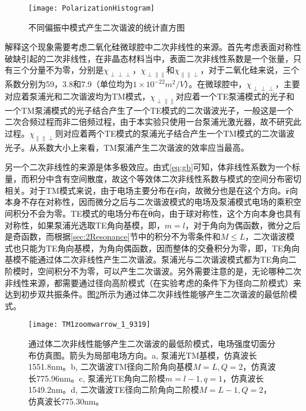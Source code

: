 \begin{figure}
\centering
\texttt{[image: PolarizationHistogram]}
\caption{不同偏振中模式产生二次谐波的统计直方图}
\label{pic:PolarizationHistogram}
\end{figure}

解释这个现象需要考虑二氧化硅微球腔中二次非线性的来源。首先考虑表面对称性破缺引起的二次非线性，在非晶态材料当中，表面二次非线性系数是一个张量，只有三个分量不为零，分别是$\chi_{\perp \perp \perp}$，$\chi_{\perp \parallel \parallel}$和$\chi_{\parallel \parallel \perp}$，对于二氧化硅来说，三个系数分别为59，3.8和7.9（单位均为$1\times 10^{-22} m^2/V$）。在微球腔中，$\chi_{\perp \perp \perp}$，主要对应着泵浦光和二次谐波均为TM模式，$\chi_{\perp \parallel \parallel}$对应着一个TE泵浦模式的光子和一个TM泵浦模式的光子结合产生了一个TE模式的二次谐波光子，一般这是一个二次合频过程而非二倍频过程，由于本实验只使用一台泵浦光激光器，故不研究此过程。$\chi_{\parallel \parallel \perp}$则对应着两个TE模式的泵浦光子结合产生一个TM模式的二次谐波光子。从系数大小上来看，TM泵浦产生二次谐波的效率应当最高。

另一个二次非线性的来源是体多极效应。由式\ref{eq:gb}可知，体非线性系数为一个标量，而积分中含有空间散度，故这个等效体二次非线性系数与模式的空间分布密切相关。对于TM模式来说，由于电场主要分布在$\mathbf{\hat{r}} $向，故微分也是在这个方向。$\mathbf{\hat{r}} $向本身不存在对称性，因而微分之后与二次谐波模式的电场及泵浦模式电场的乘积空间积分不会为零。TE模式的电场分布在$\mathbf{\hat{\theta}} $向，由于球对称性，这个方向本身也具有对称性，如果泵浦光选取TE角向基模，即，$m=l$，对于角向为偶函数，微分之后是奇函数，而根据\ref{sec:2Resonance}节中的积分不为零条件和$M\le L$，二次谐波模式也只能为TE角向基模，为角向偶函数，因而整体的交叠积分为零，即，TE角向基模不能通过体二次非线性产生二次谐波。泵浦光与二次谐波模式都为TE角向二阶模时，空间积分不为零，可以产生二次谐波。另外需要注意的是，无论哪种二次非线性来源，都需要通过径向高阶模式（在实验考虑的条件下为径向二阶模式）来达到初步双共振条件。图\ref{pic:TM1zoomwarrow_1_9319}所示为通过体二次非线性能够产生二次谐波的最低阶模式。

\begin{figure}
\centering
\texttt{[image: TM1zoomwarrow\_1\_9319]}
\caption{通过体二次非线性能够产生二次谐波的最低阶模式，电场强度切面分布仿真图。箭头为局部电场方向。a, 泵浦光TM基模，仿真波长1551.8nm。b, 二次谐波TM径向二阶角向基模$M=L, Q=2$，仿真波长775.96nm。c, 泵浦光TE角向二阶模$m=l-1, q=1$，仿真波长1549.2nm。d, 二次谐波TE径向二阶角向二阶模$M=L-1, Q=2$，仿真波长775.30nm。}
\label{pic:TM1zoomwarrow_1_9319}
\end{figure}

